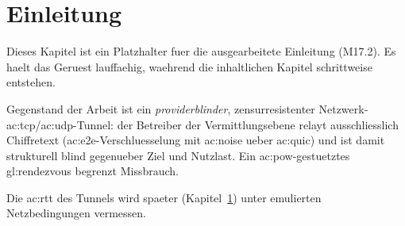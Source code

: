 \chapter{Einleitung}
\label{ch:einleitung}

Dieses Kapitel ist ein Platzhalter fuer die ausgearbeitete Einleitung
(M17.2). Es haelt das Geruest lauffaehig, waehrend die inhaltlichen Kapitel
schrittweise entstehen.

Gegenstand der Arbeit ist ein \emph{providerblinder}, zensurresistenter
Netzwerk-\gls{ac:tcp}/\gls{ac:udp}-Tunnel: der Betreiber der Vermittlungsebene
relayt ausschliesslich Chiffretext (\gls{ac:e2e}-Verschluesselung mit
\gls{ac:noise} ueber \gls{ac:quic}) und ist damit strukturell blind gegenueber
Ziel und Nutzlast. Ein \gls{ac:pow}-gestuetztes \gls{gl:rendezvous} begrenzt
Missbrauch.

Die \gls{ac:rtt} des Tunnels wird spaeter (Kapitel~\ref{ch:einleitung}) unter
emulierten Netzbedingungen vermessen.
